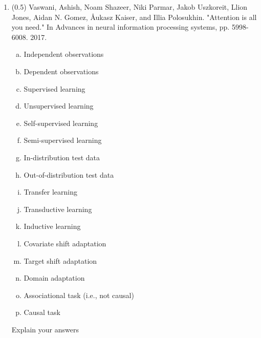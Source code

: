 \documentclass{article}
\begin{document}
\begin{enumerate}
 \newpage

\item (0.5) Vaswani, Ashish, Noam Shazeer, Niki Parmar, Jakob Uszkoreit, Llion Jones, Aidan N. Gomez, Åukasz Kaiser, and Illia Polosukhin. "Attention is all you need." In Advances in neural information processing systems, pp. 5998-6008. 2017.
\begin{enumerate}[(a)]
\item Independent observations
\item Dependent observations
\item Supervised learning
\item Unsupervised learning
\item Self-supervised learning
\item Semi-supervised learning
\item In-distribution test data
\item Out-of-distribution test data
\item Transfer learning
\item Transductive learning
\item Inductive  learning
\item Covariate shift adaptation
\item Target shift adaptation
\item Domain adaptation
\item Associational task (i.e., not causal)
\item Causal task
\end{enumerate}
Explain your answers\\
\underline{\hspace{6in}}\\
\underline{\hspace{6in}}\\
\underline{\hspace{6in}}\\
\underline{\hspace{6in}}\\
\underline{\hspace{6in}}\\
\underline{\hspace{6in}}\\
\underline{\hspace{6in}}\\
\underline{\hspace{6in}}\\
\underline{\hspace{6in}}\\
\underline{\hspace{6in}}\\
\underline{\hspace{6in}}\\
\underline{\hspace{6in}}\\
\underline{\hspace{6in}}\\
\underline{\hspace{6in}}\\
\underline{\hspace{6in}}\\


\end{enumerate}
\end{document}
